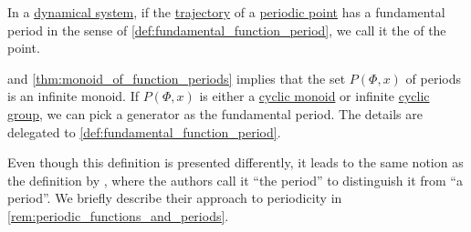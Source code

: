 \begin{definition}\label{def:dynamical_system_fundamental_period}\mimprovised
  In a \hyperref[def:dynamical_system]{dynamical system}, if the \hyperref[def:dynamical_system_trajectory]{trajectory} of a \hyperref[def:dynamical_system_periodicity]{periodic point} has a fundamental period in the sense of \cref{def:fundamental_function_period}, we call it the  of the point.
\end{definition}
\begin{comments}
  \item {} and \cref{thm:monoid_of_function_periods} implies that the set \( P(\Phi, x) \) of periods is an infinite monoid. If \( P(\Phi, x) \) is either a \hyperref[def:cyclic_monoid]{cyclic monoid} or infinite \hyperref[def:cyclic_group]{cyclic group}, we can pick a generator as the fundamental period. The details are delegated to \cref{def:fundamental_function_period}.

  \item Even though this definition is presented differently, it leads to the same notion as the definition by , where the authors call it \enquote{the period} to distinguish it from \enquote{a period}. We briefly describe their approach to periodicity in \cref{rem:periodic_functions_and_periods}.
\end{comments}

